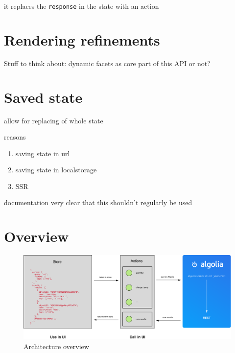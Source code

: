 it replaces the {\tt response} in the state with an action


\section{Rendering refinements} %
\label{sec:rendering_refinements}

Stuff to think about: dynamic facets as core part of this API or not?


\section{Saved state} %
\label{sec:saved_state}

allow for replacing of whole state

reasons

\begin{enumerate}
  \item saving state in url
  \item saving state in localstorage
  \item SSR
\end{enumerate}

documentation very clear that this shouldn't regularly be used


\section{Overview} %
\label{sec:overview}

\begin{figure}[H]
\label{figure:core-architecture}
  \centering
  \includegraphics[width=\textwidth]{../assets/architecture.pdf}
  \caption{Architecture overview\cite{blog-architecture}}
\end{figure}

